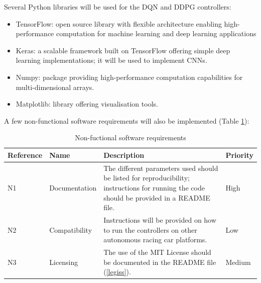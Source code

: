 Several Python libraries will be used for the DQN and DDPG controllers:
\begin{itemize}
	\item TensorFlow: open source library with flexible architecture enabling high-performance computation for machine learning and deep learning applications
	\item Keras: a scalable framework built on TensorFlow offering simple deep learning implementations; it will be used to implement CNNs.
	\item Numpy: package providing high-performance computation capabilities for multi-dimensional arrays.
	\item Matplotlib: library offering visualisation tools.
\end{itemize}

A few non-functional software requirements will also be implemented (Table \ref{nonfuncsoreqtab}):

\begin{table}[H]
\centering
\begin{tabularx}{\textwidth}{||l|X|X|l||} 
 \hline
 Reference & Name & Description & Priority\\ [0.5ex] 
 \hline\hline
 N1 & Documentation & The different parameters used should be listed for reproducibility; instructions for running the code should be provided in a README file. & High\\
 \hline
 N2 & Compatibility & Instructions will be provided on how to run the controllers on other autonomous racing car platforms. & Low\\
  \hline
 N3 & Licensing & The use of the MIT License should be documented in the README file (\ref{legiss}). & Medium\\
  \hline
\end{tabularx}
\caption{Non-fuctional software requirements}
\label{nonfuncsoreqtab}
\end{table}


